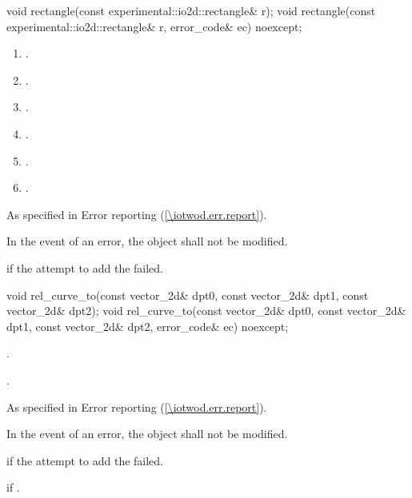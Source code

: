 \begin{itemdecl}
    void rectangle(const experimental::io2d::rectangle& r);
    void rectangle(const experimental::io2d::rectangle& r, 
      error_code& ec) noexcept;
\end{itemdecl}
\begin{itemdescr}
	\pnum
	\effects
	\begin{enumerate}
	\item {}.

	\item {}.
	
	\item {}.
	
	\item {}.
	
	\item {}.
	
	\item {}.
	\end{enumerate}
	
	\pnum
	\throws
	As specified in Error reporting (\ref{\iotwod.err.report}).

	\pnum
	\remarks
	In the event of an error, the object shall not be modified.

	\pnum
	\errors
	 if the attempt to add the  failed.
\end{itemdescr}

\begin{itemdecl}
    void rel_curve_to(const vector_2d& dpt0, const vector_2d& dpt1,
      const vector_2d& dpt2);
    void rel_curve_to(const vector_2d& dpt0, const vector_2d& dpt1,
      const vector_2d& dpt2, error_code& ec) noexcept;
\end{itemdecl}
\begin{itemdescr}
	\pnum
	\effects
	.
	
	\pnum
	.
	
	\pnum
	\throws
	As specified in Error reporting (\ref{\iotwod.err.report}).

	\pnum
	\remarks
	In the event of an error, the object shall not be modified.

	\pnum
	\errors
	 if the attempt to add the  failed.
	
	\pnum
	 if .
\end{itemdescr}

